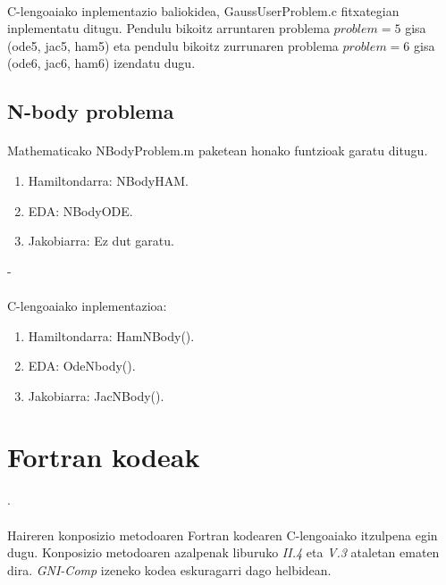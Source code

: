 \paragraph*{}C-lengoaiako inplementazio baliokidea, GaussUserProblem.c fitxategian inplementatu ditugu. Pendulu bikoitz arruntaren problema $problem=5$ gisa  (ode5, jac5, ham5) eta pendulu bikoitz zurrunaren problema $problem=6$ gisa (ode6, jac6, ham6) izendatu dugu.

\subsection*{N-body problema}

\paragraph*{} Mathematicako NBodyProblem.m paketean honako funtzioak garatu ditugu.

\begin{enumerate}
   \item Hamiltondarra: NBodyHAM.
   \item EDA: NBodyODE.
   \item Jakobiarra: Ez dut garatu.
\end{enumerate}

-\paragraph*{} C-lengoaiako inplementazioa:

\begin{enumerate}
   \item Hamiltondarra: HamNBody().
   \item EDA: OdeNbody().
   \item Jakobiarra: JacNBody().
\end{enumerate}

\section{Fortran kodeak}.

\paragraph*{} Haireren konposizio metodoaren Fortran kodearen  C-lengoaiako itzulpena egin dugu. Konposizio metodoaren azalpenak liburuko \cite{Hairer2006}  \emph{II.4} eta \emph{V.3} ataletan ematen dira. \emph{GNI-Comp} izeneko kodea eskuragarri dago \cite{HairerGniComp} helbidean.  


